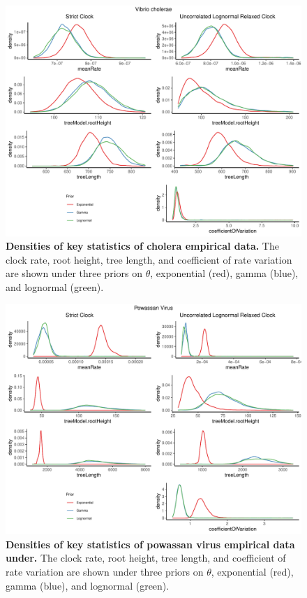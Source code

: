 \documentclass[10pt,letterpaper]{article}
\begin{document}
\begin{figure}[!h]
	\begin{center}
		\includegraphics[width=13cm]{sandbox_figures/cholera_density_plot.pdf}\newline
		\vspace{-0.5cm}
		\caption{\textbf{Densities of key statistics of cholera empirical data.} The clock rate, root height, tree length, and coefficient of rate variation are shown under three priors on $\theta$, exponential (red), gamma (blue), and lognormal (green).}
	\end{center}
\end{figure}
\begin{figure}[!h]
	\begin{center}
		\includegraphics[width=13cm]{sandbox_figures/powv_density_plot.pdf}\newline
		\vspace{-0.5cm}
		\caption{\textbf{Densities of key statistics of powassan virus empirical data under.} The clock rate, root height, tree length, and coefficient of rate variation are shown under three priors on $\theta$, exponential (red), gamma (blue), and lognormal (green).}
	\end{center}
\end{figure}
\end{document}
